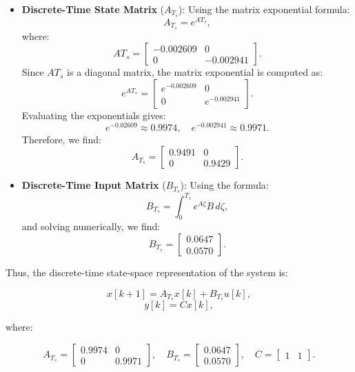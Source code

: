 \begin{itemize}
    \item \textbf{Discrete-Time State Matrix} (\(A_{T_s}\)): 
   Using the matrix exponential formula:
   \[
   A_{T_s} = e^{A T_s},
   \]
   where:
   \[
   A T_s = 
   \begin{bmatrix}
   -0.002609 & 0 \\
   0 & -0.002941
   \end{bmatrix}.
   \]
   Since \( A T_s \) is a diagonal matrix, the matrix exponential is computed as:
   \[
   e^{A T_s} = 
   \begin{bmatrix}
   e^{-0.002609} & 0 \\
   0 & e^{-0.002941}
   \end{bmatrix}.
   \]
   Evaluating the exponentials gives:
   \[
   e^{-0.02609} \approx 0.9974, \quad e^{-0.002941} \approx 0.9971.
   \]
   Therefore, we find:
   \[
   A_{T_s} = 
   \begin{bmatrix}
   0.9491 & 0 \\
   0 & 0.9429
   \end{bmatrix}.
   \]
\end{itemize}

\begin{itemize} 
    \item \textbf{Discrete-Time Input Matrix} (\(B_{T_s}\)): 
   Using the formula:
   \[
   B_{T_s} = \int_0^{T_s} e^{A \zeta} B \, d\zeta,
   \]
   and solving numerically, we find:
   \[
   B_{T_s} = 
   \begin{bmatrix}
    0.0647 \\
    0.0570
   \end{bmatrix}.
   \]
\end{itemize}

Thus, the discrete-time state-space representation of the system is:

\[
x[k+1] = A_{T_s} x[k] + B_{T_s} u[k],
\]
\[
y[k] = C x[k],
\]

where:

\[
    A_{T_s} = 
    \begin{bmatrix}
    0.9974 & 0 \\
    0 & 0.9971
    \end{bmatrix}, \quad
    B_{T_s} = 
    \begin{bmatrix}
    0.0647 \\
    0.0570
    \end{bmatrix}, \quad
    C = 
    \begin{bmatrix}
    1 & 1
    \end{bmatrix}.
\]

